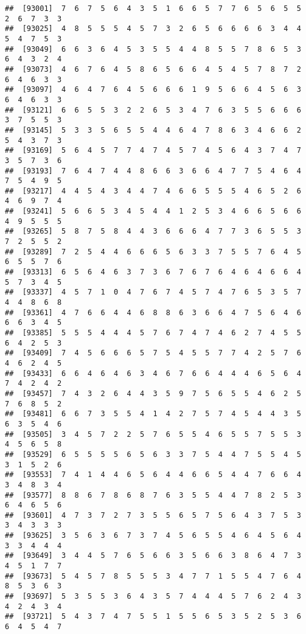\documentclass[
]{book}
\begin{document}
\begin{verbatim}
##  [93001]  7  6  7  5  6  4  3  5  1  6  6  5  7  7  6  5  6  5  5  2  6  7  3  3
##  [93025]  4  8  5  5  5  4  5  7  3  2  6  5  6  6  6  6  3  4  4  5  4  7  5  3
##  [93049]  6  6  3  6  4  5  3  5  5  4  4  8  5  5  7  8  6  5  3  6  4  3  2  4
##  [93073]  4  6  7  6  4  5  8  6  5  6  6  4  5  4  5  7  8  7  2  6  4  6  3  3
##  [93097]  4  6  4  7  6  4  5  6  6  6  1  9  5  6  6  4  5  6  3  6  4  6  3  3
##  [93121]  6  6  5  5  3  2  2  6  5  3  4  7  6  3  5  5  6  6  6  3  7  5  5  3
##  [93145]  5  3  3  5  6  5  5  4  4  6  4  7  8  6  3  4  6  6  2  5  4  3  7  3
##  [93169]  5  6  4  5  7  7  4  7  4  5  7  4  5  6  4  3  7  4  7  3  5  7  3  6
##  [93193]  7  6  4  7  4  4  8  6  6  3  6  6  4  7  7  5  4  6  4  7  5  4  9  5
##  [93217]  4  4  5  4  3  4  4  7  4  6  6  5  5  5  4  6  5  2  6  4  6  9  7  4
##  [93241]  5  6  6  5  3  4  5  4  4  1  2  5  3  4  6  6  5  6  6  4  9  5  5  5
##  [93265]  5  8  7  5  8  4  4  3  6  6  6  4  7  7  3  6  5  5  3  7  2  5  5  2
##  [93289]  7  2  5  4  4  6  6  6  5  6  3  3  7  5  5  7  6  4  5  6  5  5  7  6
##  [93313]  6  5  6  4  6  3  7  3  6  7  6  7  6  4  6  4  6  6  4  5  7  3  4  5
##  [93337]  4  5  7  1  0  4  7  6  7  4  5  7  4  7  6  5  3  5  7  4  4  8  6  8
##  [93361]  4  7  6  6  4  4  6  8  8  6  3  6  6  4  7  5  6  4  6  6  6  3  4  5
##  [93385]  5  5  5  4  4  4  5  7  6  7  4  7  4  6  2  7  4  5  5  6  4  2  5  3
##  [93409]  7  4  5  6  6  6  5  7  5  4  5  5  7  7  4  2  5  7  6  4  6  2  4  5
##  [93433]  6  6  4  6  4  6  3  4  6  7  6  6  4  4  4  6  5  6  4  7  4  2  4  2
##  [93457]  7  4  3  2  6  4  4  3  5  9  7  5  6  5  5  4  6  2  5  7  6  8  5  2
##  [93481]  6  6  7  3  5  5  4  1  4  2  7  5  7  4  5  4  4  3  5  6  3  5  4  6
##  [93505]  3  4  5  7  2  2  5  7  6  5  5  4  6  5  5  7  5  5  3  4  5  6  5  8
##  [93529]  6  5  5  5  5  6  5  6  3  3  7  5  4  4  7  5  5  4  5  3  1  5  2  6
##  [93553]  7  4  1  4  4  6  5  6  4  4  6  6  5  4  4  7  6  6  4  3  4  8  3  4
##  [93577]  8  8  6  7  8  6  8  7  6  3  5  5  4  4  7  8  2  5  3  6  4  6  5  6
##  [93601]  4  7  3  7  2  7  3  5  5  6  5  7  5  6  4  3  7  5  3  3  4  3  3  3
##  [93625]  3  5  6  3  6  7  3  7  4  5  6  5  5  4  6  4  5  6  4  3  3  4  4  4
##  [93649]  3  4  4  5  7  6  5  6  6  3  5  6  6  3  8  6  4  7  3  4  5  1  7  7
##  [93673]  5  4  5  7  8  5  5  5  3  4  7  7  1  5  5  4  7  6  4  8  5  3  6  3
##  [93697]  5  3  5  5  3  6  4  3  5  7  4  4  4  5  7  6  2  4  3  4  2  4  3  4
##  [93721]  5  4  3  7  4  7  5  5  1  5  5  6  5  3  5  2  5  3  6  6  4  5  4  7

\end{verbatim}
\end{document}
